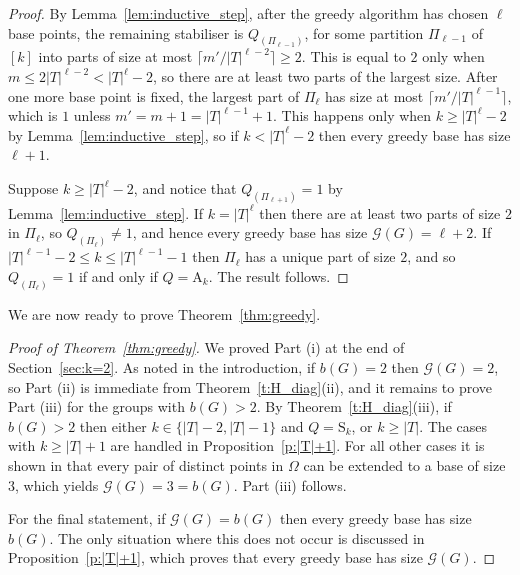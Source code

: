 \documentclass[twoside,a4paper,reqno,11pt]{amsart}
\newcommand{\<}{\langle}
\renewcommand{\>}{\rangle}
\newcommand{\leqs}{\leqslant}
\newcommand{\geqs}{\geqslant}
\newcommand{\Sn}{\mathrm{S}}
\newcommand{\An}{\mathrm{A}}
\theoremstyle{definition}
\begin{document}
\begin{proof}
    By Lemma~\ref{lem:inductive_step}, after the greedy algorithm has chosen $\ell$ base points,
    the remaining %
    stabiliser is $Q_{(\Pi_{\ell-1})}$, for some partition $\Pi_{\ell-1}$ of $[k]$ into parts of size at most $\lceil m'/|T|^{\ell-2} \rceil \geqs 2$. This is equal to $2$ only when $m \leqs 2|T|^{\ell-2} < |T|^{\ell}-2$, so there are at least two parts of the largest size. After one more base point is fixed, %
    the largest part of $\Pi_{\ell}$ has size at most $\lceil m'/|T|^{\ell-1} \rceil$, which is $1$ unless $m' = m+1 = |T|^{\ell-1} + 1$.  This happens only when $k \geqs |T|^{\ell} - 2$ by Lemma~\ref{lem:inductive_step}, so if $k < |T|^{\ell}-2$ then every greedy base has size $\ell +1$.

    Suppose $k \geqs |T|^{\ell} -2$, and notice that $Q_{(\Pi_{\ell + 1})} = 1$ by Lemma~\ref{lem:inductive_step}. If $k = |T|^{\ell}$ then there are at least two parts of size $2$ in $\Pi_{\ell}$, so $Q_{(\Pi_{\ell})} \neq 1$, and hence every greedy base has size $\mathcal{G}(G) = \ell + 2$. If $|T|^{\ell-1} - 2 \leqs k \leqs |T|^{\ell-1} - 1$ then $\Pi_{\ell}$ has a unique part of size $2$, and so $Q_{(\Pi_{\ell})} = 1$ if and only if $Q = \An_{k}$. The result follows. 
\end{proof}

We are now ready to prove Theorem~\ref{thm:greedy}.

\begin{proof}[Proof of Theorem~\ref{thm:greedy}] We proved Part (i) at the end of Section~\ref{sec:k=2}. As noted in the introduction,
if $b(G) = 2$ then $\mathcal{G}(G) = 2$, so 
    Part (ii) is immediate from Theorem~\ref{t:H_diag}(ii), and it remains to prove Part (iii) for the groups with $b(G) > 2$. By Theorem~\ref{t:H_diag}(iii), if $b(G) > 2$ then either $k\in \{|T|-2, |T|-1\}$ and $Q = \Sn_k$, or $k\geqs |T|$. The cases with $k\geqs |T|+1$ are handled in Proposition~\ref{p:|T|+1}. For all other cases it is shown in \cite[Proposition~3.5]{FHLR_Saxl} that every pair of distinct points in $\Omega$ can be extended to a base of size $3$, which yields $\mathcal{G}(G) = 3 = b(G)$. Part (iii) follows. 
    
    For the final statement, if $\mathcal{G}(G) = b(G)$ then every greedy base has size $b(G)$. The only situation where this does not occur is discussed in  Proposition~\ref{p:|T|+1}, which proves that every greedy base has size $\mathcal{G}(G)$. 
\end{proof}
\end{document}
